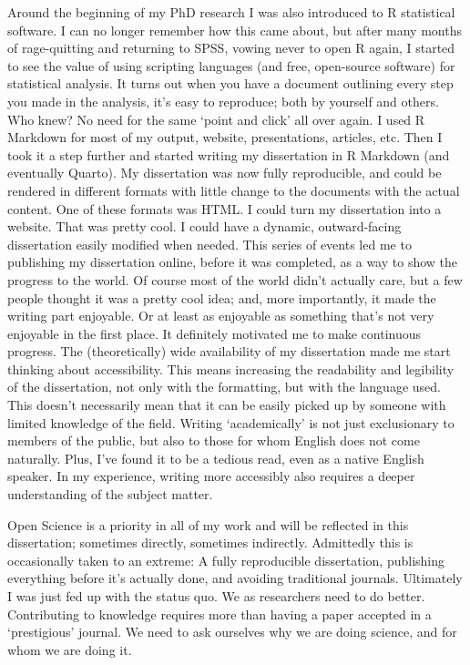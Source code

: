 \documentclass[
  b5paper,
]{book}
\begin{document}
Around the beginning of my PhD research I was also introduced to R
statistical software. I can no longer remember how this came about, but
after many months of rage-quitting and returning to SPSS, vowing never
to open R again, I started to see the value of using scripting languages
(and free, open-source software) for statistical analysis. It turns out
when you have a document outlining every step you made in the analysis,
it's easy to reproduce; both by yourself and others. Who knew? No need
for the same `point and click' all over again. I used R Markdown for
most of my output, website, presentations, articles, etc. Then I took it
a step further and started writing my dissertation in R Markdown (and
eventually Quarto). My dissertation was now fully reproducible, and
could be rendered in different formats with little change to the
documents with the actual content. One of these formats was HTML. I
could turn my dissertation into a website. That was pretty cool. I could
have a dynamic, outward-facing dissertation easily modified when needed.
This series of events led me to publishing my dissertation online,
before it was completed, as a way to show the progress to the world. Of
course most of the world didn't actually care, but a few people thought
it was a pretty cool idea; and, more importantly, it made the writing
part enjoyable. Or at least as enjoyable as something that's not very
enjoyable in the first place. It definitely motivated me to make
continuous progress. The (theoretically) wide availability of my
dissertation made me start thinking about accessibility. This means
increasing the readability and legibility of the dissertation, not only
with the formatting, but with the language used. This doesn't
necessarily mean that it can be easily picked up by someone with limited
knowledge of the field. Writing `academically' is not just exclusionary
to members of the public, but also to those for whom English does not
come naturally. Plus, I've found it to be a tedious read, even as a
native English speaker. In my experience, writing more accessibly also
requires a deeper understanding of the subject matter.

Open Science is a priority in all of my work and will be reflected in
this dissertation; sometimes directly, sometimes indirectly. Admittedly
this is occasionally taken to an extreme: A fully reproducible
dissertation, publishing everything before it's actually done, and
avoiding traditional journals. Ultimately I was just fed up with the
status quo. We as researchers need to do better. Contributing to
knowledge requires more than having a paper accepted in a `prestigious'
journal. We need to ask ourselves why we are doing science, and for whom
we are doing it.
\end{document}
